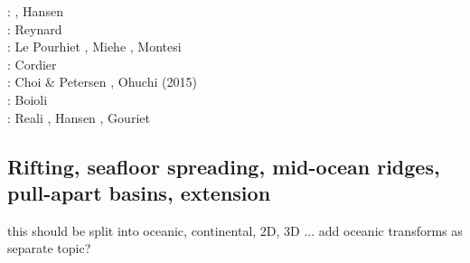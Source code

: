 \begin{scriptsize}
\twothousandeleven: \cite{lell11}\cite{kemk11}, Hansen \etal \cite{hazk11}\\
\twothousandtwelve: Reynard \cite{reyn12}\\
\twothousandthirteen: Le Pourhiet \cite{lepo13}, Miehe \etal \cite{miam13}, Montesi \cite{mont13}\\
\twothousandfourteen: Cordier \etal \cite{codb14}\\
\twothousandfifteen: Choi \& Petersen \cite{chpe15}, Ohuchi \etal (2015) \cite{ohkh15}\\
\twothousandseventeen: Boioli \etal \cite{bocc17}\\
\twothousandnineteen: Reali \etal \cite{rejv19}, Hansen \etal \cite{hakt19}, Gouriet \etal \cite{gocg19}
\end{scriptsize}

\subsection{Rifting, seafloor spreading, mid-ocean ridges, pull-apart basins, extension}

{\color{red} this should be split into oceanic, continental, 2D, 3D ...}
add oceanic transforms as separate topic?

